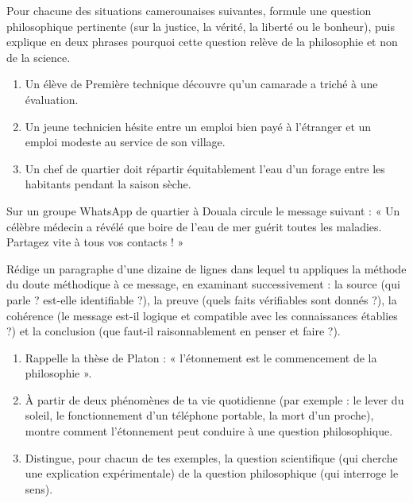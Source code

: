 \documentclass[11pt]{article}
\newcommand{\cle}[1]{{\popxbold\color{popdark}#1}}
\begin{document}
\begin{exercice}
Pour chacune des situations camerounaises suivantes, formule une question philosophique pertinente (sur la justice, la vérité, la liberté ou le bonheur), puis explique en deux phrases pourquoi cette question relève de la philosophie et non de la science.
\begin{enumerate}
\item Un élève de Première technique découvre qu'un camarade a triché à une évaluation.
\item Un jeune technicien hésite entre un emploi bien payé à l'étranger et un emploi modeste au service de son village.
\item Un chef de quartier doit répartir équitablement l'eau d'un forage entre les habitants pendant la saison sèche.
\end{enumerate}
\end{exercice}

\begin{exercice}
Sur un groupe WhatsApp de quartier à Douala circule le message suivant : « Un célèbre médecin a révélé que boire de l'eau de mer guérit toutes les maladies. Partagez vite à tous vos contacts ! »

Rédige un paragraphe d'une dizaine de lignes dans lequel tu appliques la méthode du \cle{doute méthodique} à ce message, en examinant successivement : la \cle{source} (qui parle ? est-elle identifiable ?), la \cle{preuve} (quels faits vérifiables sont donnés ?), la \cle{cohérence} (le message est-il logique et compatible avec les connaissances établies ?) et la \cle{conclusion} (que faut-il raisonnablement en penser et faire ?).
\end{exercice}

\begin{exercice}
\begin{enumerate}
\item Rappelle la thèse de Platon : « l'étonnement est le commencement de la philosophie ».
\item À partir de deux phénomènes de ta vie quotidienne (par exemple : le lever du soleil, le fonctionnement d'un téléphone portable, la mort d'un proche), montre comment l'étonnement peut conduire à une question philosophique.
\item Distingue, pour chacun de tes exemples, la question scientifique (qui cherche une explication expérimentale) de la question philosophique (qui interroge le sens).
\end{enumerate}
\end{exercice}
\end{document}
